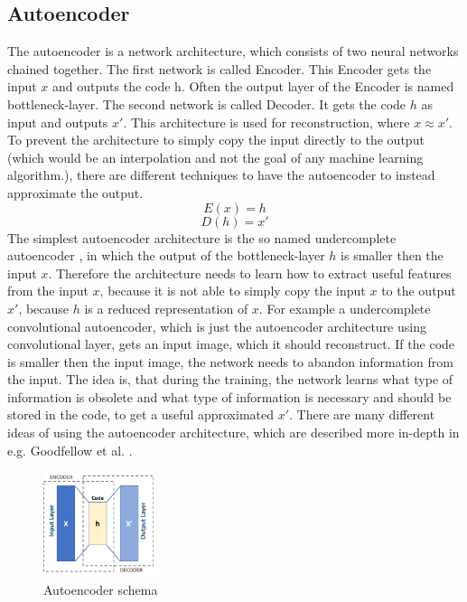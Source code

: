  \subsection{Autoencoder} \label{subsection::autoencoder}
  The autoencoder is a network architecture, which consists of two neural networks chained together. The first network is called Encoder. This Encoder gets the input $x$ and outputs
  the code h. Often the output layer of the Encoder is named bottleneck-layer. The second network is called Decoder. It gets the code $h$ as input
  and outputs $x \prime$. This architecture is used for reconstruction, where $x \approx x \prime$. To prevent the architecture to simply copy the input directly to the output (which would be an
  interpolation and not the goal of any machine learning algorithm.), there are different techniques to have the autoencoder to instead approximate the output.
  \begin{equation}
   E(x) = h
  \end{equation}
  \begin{equation}
   D(h) = x \prime
  \end{equation}
  The simplest autoencoder architecture is the so named undercomplete autoencoder \cite{Goodfellow2016}, in which the output of the bottleneck-layer $h$ is smaller then the input $x$.
  Therefore the architecture needs to learn how to extract useful features from the input $x$, because it is not able to simply copy the input $x$ to the output $x \prime$, because $h$ is a reduced
  representation of $x$.
  For example a undercomplete convolutional autoencoder, which is just the autoencoder architecture using convolutional layer, gets an input image, which it 
  should reconstruct.
  If the code is smaller then the input image, the network needs to abandon information from the input. The idea is, that during the training, the network learns
  what type of information is obsolete and what type of information is necessary and should be stored in the code, to get a useful approximated $x \prime$.  
  There are many different ideas of using the autoencoder architecture, which are described more in-depth in e.g. Goodfellow et al. \cite{Goodfellow2016}.
  \begin{figure}[H]
   \includegraphics[width=0.3\textwidth]{../Images/autoencoder_schema.png}
   \centering
   \caption{Autoencoder schema \cite{wiki2019}}
   \label{fig:lstm_architecture}
  \end{figure}
  
